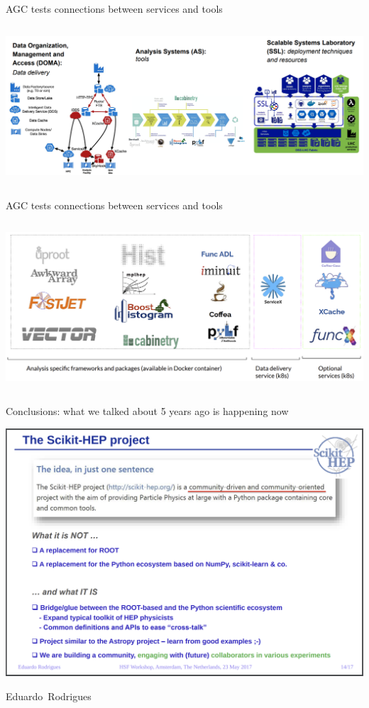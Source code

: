 \documentclass[aspectratio=169]{beamer}
\begin{document}
\begin{frame}{AGC tests connections between services and tools}
\vspace{0.35 cm}
\begin{columns}
\includegraphics[width=\linewidth]{PLOTS/agc-intersection-of-services-and-tools.png}
\end{columns}
\end{frame}

\begin{frame}{AGC tests connections between services and tools}
\vspace{0.35 cm}
\begin{columns}
\includegraphics[width=\linewidth]{PLOTS/agc-intersection-of-services-and-tools-2.png}
\end{columns}
\end{frame}

\begin{frame}{Conclusions: what we talked about 5 years ago is happening now}
\vspace{0.25 cm}
\begin{center}
\includegraphics[width=0.77\linewidth]{PLOTS/scikit-hep-in-2017.png}
\end{center}

\vspace{-1.5 cm}
\hfill \mbox{Eduardo Rodrigues\hspace{-0.5 cm}}
\vspace{1.5 cm}
\end{frame}
\end{document}
